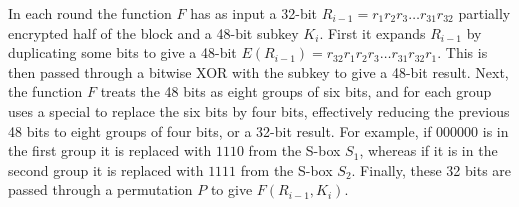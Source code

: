 In each round the function $F$ has as input a 32-bit
$R_{i-1}=r_1r_2r_3\dots r_{31}r_{32}$
partially encrypted half of the block and a 48-bit subkey $K_i$.
First it expands $R_{i-1}$ by duplicating some bits to give a 48-bit
$E\left(R_{i-1}\right)=r_{32}r_1r_2r_3\dots r_{31}r_{32}r_1$.
This is then passed through a bitwise XOR with the subkey
to give a 48-bit result.
Next, the function $F$ treats the 48 bits as eight groups of six bits,
and for each group uses a special  to replace the six bits
by four bits, effectively reducing the previous 48 bits to eight groups of four bits,
or a 32-bit result.
For example, if $000000$ is in the first group it is replaced with $1110$ from
the S-box $S_1$, whereas if it is in the second group it is replaced
with $1111$ from the S-box $S_2$.
Finally, these 32 bits are passed through a permutation $P$
to give $F\left(R_{i-1},K_i\right)$.
\setlength{\columnsep}{1cm}

